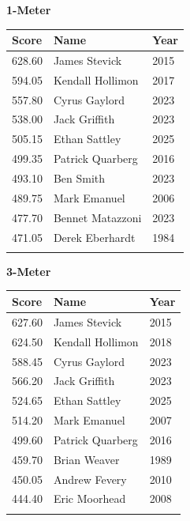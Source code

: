 \vspace{1.2em}
\noindent\begin{minipage}[t]{0.48\textwidth}
\centering
\textbf{\textcolor{teamprimary}{1-Meter}}\par
\vspace{0.5em}
\centering
\small
\renewcommand{\arraystretch}{1.0}
\setlength{\tabcolsep}{4pt}
\begin{tabular}{@{}p{1.8cm}p{3.0cm}p{1.0cm}@{}}
\toprule
\textbf{Score} & \textbf{Name} & \textbf{Year} \\
\midrule
628.60 & James Stevick & 2015 \\
594.05 & Kendall Hollimon & 2017 \\
557.80 & Cyrus Gaylord & 2023 \\
538.00 & Jack Griffith & 2023 \\
505.15 & Ethan Sattley & 2025 \\
499.35 & Patrick Quarberg & 2016 \\
493.10 & Ben Smith & 2023 \\
489.75 & Mark Emanuel & 2006 \\
477.70 & Bennet Matazzoni & 2023 \\
471.05 & Derek Eberhardt & 1984 \\
\bottomrule
\vspace{0.5em}
\end{tabular}
\end{minipage}
\hfill
\begin{minipage}[t]{0.48\textwidth}
\centering
\textbf{\textcolor{teamprimary}{3-Meter}}\par
\vspace{0.5em}
\centering
\small
\renewcommand{\arraystretch}{1.0}
\setlength{\tabcolsep}{4pt}
\begin{tabular}{@{}p{1.8cm}p{3.0cm}p{1.0cm}@{}}
\toprule
\textbf{Score} & \textbf{Name} & \textbf{Year} \\
\midrule
627.60 & James Stevick & 2015 \\
624.50 & Kendall Hollimon & 2018 \\
588.45 & Cyrus Gaylord & 2023 \\
566.20 & Jack Griffith & 2023 \\
524.65 & Ethan Sattley & 2025 \\
514.20 & Mark Emanuel & 2007 \\
499.60 & Patrick Quarberg & 2016 \\
459.70 & Brian Weaver & 1989 \\
450.05 & Andrew Fevery & 2010 \\
444.40 & Eric Moorhead & 2008 \\
\bottomrule
\vspace{0.5em}
\end{tabular}
\end{minipage}
